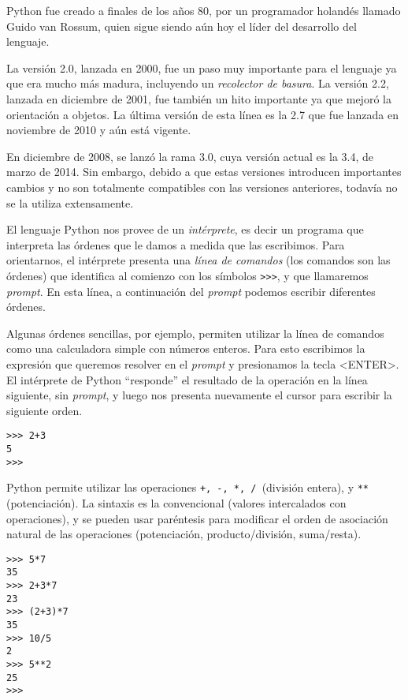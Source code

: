 \begin{sabias_que}
Python fue creado a finales de los años 80, por un programador holandés
llamado Guido van Rossum, quien sigue siendo aún hoy el líder del
desarrollo del lenguaje.

La versión 2.0, lanzada en 2000, fue un paso muy importante para el
lenguaje ya que era mucho más madura, incluyendo un \textit{recolector de
basura}.  La versión 2.2, lanzada en diciembre de 2001, fue también un hito
importante ya que mejoró la orientación a objetos.  La última versión de
esta línea es la 2.7 que fue lanzada en noviembre de 2010 y aún está vigente.

En diciembre de 2008, se lanzó la rama 3.0, cuya versión actual es la
3.4, de marzo de 2014. Sin embargo, debido a que estas versiones
introducen importantes cambios y no son totalmente compatibles
con las versiones anteriores, todavía no se la utiliza extensamente.
\end{sabias_que}

El lenguaje Python nos provee de un {\it intérprete}, es decir un programa que
interpreta las órdenes que le damos a medida que las escribimos. Para
orientarnos, el intérprete presenta una {\it línea de comandos} (los comandos
son las órdenes) que identifica al comienzo con los símbolos
\lstinline!>>>!, y que
llamaremos {\it prompt}. En esta línea, a continuación del {\it prompt}
podemos escribir diferentes órdenes.

Algunas órdenes sencillas, por ejemplo, permiten utilizar la línea de comandos
como una calculadora simple con números enteros. Para esto escribimos la
expresión que queremos resolver en el {\it prompt} y presionamos la tecla
<ENTER>. El intérprete de Python ``responde'' el resultado de la operación en
la línea siguiente, sin {\it prompt}, y luego nos presenta nuevamente el
cursor para escribir la siguiente orden.

\begin{lstlisting}[numbers=none]
>>> 2+3
5
>>>
\end{lstlisting}

Python permite utilizar las operaciones \lstinline!+, -, *, / !(división
entera), y \lstinline!**! (potenciación).  La sintaxis es la convencional
(valores intercalados con operaciones), y se pueden usar paréntesis para
modificar el orden de asociación natural de las operaciones (potenciación,
producto/división, suma/resta).

\begin{lstlisting}[numbers=none]
>>> 5*7
35
>>> 2+3*7
23
>>> (2+3)*7
35
>>> 10/5
2
>>> 5**2
25
>>>
\end{lstlisting}

